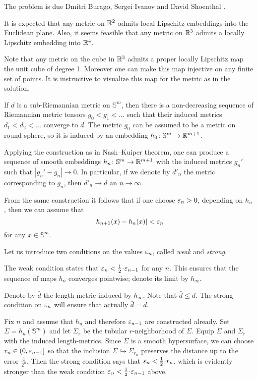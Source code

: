 The problem is due
Dmitri Burago, 
Sergei Ivanov 
and David Shoenthal \cite[see][]{BIS}.

It is expected that any metric on $\mathbb{R}^2$ admits local Lipschitz embeddings into the Euclidean plane.
Also, it seems feasible that any metric on $\mathbb{R}^3$ admits a locally Lipschitz embedding into $\mathbb{R}^4$.

Note that any metric on the cube in $\mathbb{R}^3$ admits a proper locally Lipschitz map the unit cube of degree 1.
Moreover one can make this map injective on any finite set of points.
It is instructive to visualize this map for the metric as in the solution.

If $d$ is a sub-Riemannian metric on $\mathbb{S}^m$,
then there is a non-decreasing sequence of Riemannian metric tensors
$g_0< g_1<\dots$ such that their induced metrics $d_1<d_2<\dots$ converge to $d$.
The metric $g_0$ can be assumed to be a metric on round sphere,
so it is induced by an embedding $h_0\colon\mathbb{S}^m\to \mathbb{R}^{m+1}$.

Applying the construction as in Nash--Kuiper theorem,
one can produce a sequence of smooth embeddings $h_n\colon\mathbb{S}^m\to \mathbb{R}^{m+1}$ with the induced metrics $g_n'$
such that $|g_n'-g_n|\to 0$.
In particular, if we denote by $d'_n$ the metric corresponding to $g_n$, then $d'_n\to d$ an $n\to\infty$.

From the same construction it follows that
if one choose $\varepsilon_n>0$, depending on $h_n$,
then we can assume that 
\[|h_{n+1}(x)-h_n(x)|<\varepsilon_n\] for any $x\in \mathbb{S}^m$.

Let us introduce two conditions on the values $\varepsilon_n$, called \emph{weak} and \emph{strong}.

The weak condition states that $\eps_{n}< \tfrac1{2}\cdot \eps_{n-1}$ for any $n$.
This ensures that the sequence of maps $h_n$ converges pointwise;
denote its limit by $h_\infty$.

Denote by $\bar d$ the length-metric induced by $h_\infty$.
Note that $\bar d\le d$.
The strong condition on $\varepsilon_n$ will ensure that actually $\bar d=d$.

Fix $n$ and assume that $h_n$ and therefore $\varepsilon_{n-1}$ are constructed already.
Set $\Sigma=h_n(\mathbb{S}^m)$
and let $\Sigma_r$ be the tubular $r$-neighborhood of $\Sigma$.
Equip $\Sigma$ and $\Sigma_r$ with the induced length-metrics.
Since $\Sigma$ is a smooth hypersurface, we can choose $r_n\in(0,\varepsilon_{n-1}]$ 
so that the inclusion $\Sigma\hookrightarrow \Sigma_{r_n}$ preserves the distance up to the error $\tfrac1{2^n}$.
Then the strong condition says that $\eps_n< \tfrac12\cdot r_n$, 
which is evidently stronger than the weak condition  $\eps_{n}< \tfrac1{2}\cdot \eps_{n-1}$ above.

